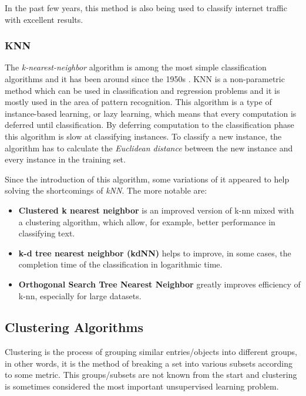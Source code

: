 In the past few years, this method is also being used to classify internet
traffic with excellent results.\cite{Yuan2010}


\subsubsection{KNN}

The \emph{k-nearest-neighbor} algorithm is among the most simple classification
algorithms and it has been around since the 1950s \cite[p.348]{HanKam06}. KNN is
a non-parametric method which can be used in classification and regression
problems and it is mostly used in the area of pattern recognition. This
algorithm is a type of instance-based learning, or lazy learning, which means
that every computation is deferred until classification. By deferring
computation to the classification phase this algorithm is slow at classifying
instances. To classify a new instance, the algorithm has to calculate the
\emph{Euclidean distance} between the new instance and every instance in the
training set.

Since the introduction of this algorithm, some variations of it appeared to help
solving the shortcomings of \emph{kNN}.\cite{DBLP:journals/corr/abs-1007-0085}
The more notable are: \begin{itemize} \item \textbf{Clustered k nearest
      neighbor} \cite{journals/jcp/ZhouLX09} is an improved version of k-nn
      mixed with a clustering algorithm, which allow, for example, better
    performance in classifying text. \item \textbf{k-d tree nearest neighbor
      (kdNN)} \cite{Sproull1991} helps to improve, in some cases, the completion
      time of the classification in logarithmic time. \item \textbf{Orthogonal
    Search Tree Nearest Neighbor} \cite{955110} greatly improves efficiency of
k-nn, especially for large datasets. \end{itemize}

\subsection{Clustering Algorithms}\label{sec:clust}

Clustering is the process of grouping similar entries/objects into different
groups, in other words, it is the method of breaking a set into various subsets
according to some metric. This groups/subsets are not known from the start and
clustering is sometimes considered the most important unsupervised learning
problem\cite{DBLP:journals/corr/abs-1205-1117}.

